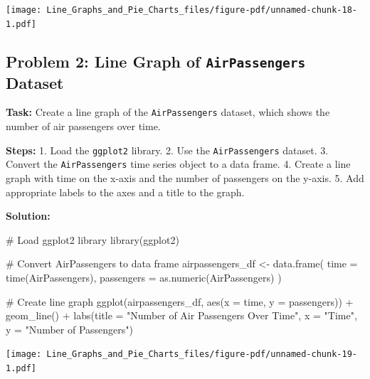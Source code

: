 \documentclass[
  letterpaper,
  DIV=11,
  numbers=noendperiod]{scrreprt}
\newenvironment{Shaded}{\begin{snugshade}}{\end{snugshade}}
\newcommand{\AttributeTok}[1]{\textcolor[rgb]{0.40,0.45,0.13}{#1}}
\newcommand{\CommentTok}[1]{\textcolor[rgb]{0.37,0.37,0.37}{#1}}
\newcommand{\FunctionTok}[1]{\textcolor[rgb]{0.28,0.35,0.67}{#1}}
\newcommand{\NormalTok}[1]{\textcolor[rgb]{0.00,0.23,0.31}{#1}}
\newcommand{\OtherTok}[1]{\textcolor[rgb]{0.00,0.23,0.31}{#1}}
\newcommand{\SpecialCharTok}[1]{\textcolor[rgb]{0.37,0.37,0.37}{#1}}
\newcommand{\StringTok}[1]{\textcolor[rgb]{0.13,0.47,0.30}{#1}}
\begin{document}
\texttt{[image: Line\_Graphs\_and\_Pie\_Charts\_files/figure-pdf/unnamed-chunk-18-1.pdf]}

\subsection*{\texorpdfstring{Problem 2: Line Graph of
\texttt{AirPassengers}
Dataset}{Problem 2: Line Graph of AirPassengers Dataset}}\label{problem-2-line-graph-of-airpassengers-dataset}

\textbf{Task:} Create a line graph of the \texttt{AirPassengers}
dataset, which shows the number of air passengers over time.

\textbf{Steps:} 1. Load the \texttt{ggplot2} library. 2. Use the
\texttt{AirPassengers} dataset. 3. Convert the \texttt{AirPassengers}
time series object to a data frame. 4. Create a line graph with time on
the x-axis and the number of passengers on the y-axis. 5. Add
appropriate labels to the axes and a title to the graph.

\textbf{Solution:}

\begin{Shaded}
\begin{Highlighting}[]
\CommentTok{\# Load ggplot2 library}
\FunctionTok{library}\NormalTok{(ggplot2)}

\CommentTok{\# Convert AirPassengers to data frame}
\NormalTok{airpassengers\_df }\OtherTok{\textless{}{-}} \FunctionTok{data.frame}\NormalTok{(}
  \AttributeTok{time =} \FunctionTok{time}\NormalTok{(AirPassengers),}
  \AttributeTok{passengers =} \FunctionTok{as.numeric}\NormalTok{(AirPassengers)}
\NormalTok{)}

\CommentTok{\# Create line graph}
\FunctionTok{ggplot}\NormalTok{(airpassengers\_df, }\FunctionTok{aes}\NormalTok{(}\AttributeTok{x =}\NormalTok{ time, }\AttributeTok{y =}\NormalTok{ passengers)) }\SpecialCharTok{+}
  \FunctionTok{geom\_line}\NormalTok{() }\SpecialCharTok{+}
  \FunctionTok{labs}\NormalTok{(}\AttributeTok{title =} \StringTok{"Number of Air Passengers Over Time"}\NormalTok{,}
       \AttributeTok{x =} \StringTok{"Time"}\NormalTok{,}
       \AttributeTok{y =} \StringTok{"Number of Passengers"}\NormalTok{)}
\end{Highlighting}
\end{Shaded}

\texttt{[image: Line\_Graphs\_and\_Pie\_Charts\_files/figure-pdf/unnamed-chunk-19-1.pdf]}
\end{document}
